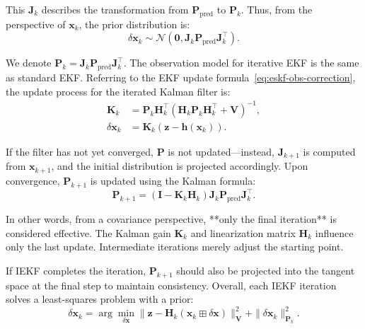 This \(\mathbf{J}_k\) describes the transformation from \(\mathbf{P}_{\mathrm{pred}}\) to \(\mathbf{P}_k\). Thus, from the perspective of \(\mathbf{x}_{k}\), the prior distribution is:  
\begin{equation}\label{key}  
	\delta \mathbf{x}_k \sim \mathcal{N}(\mathbf{0}, \mathbf{J}_k \mathbf{P}_{\mathrm{pred}} \mathbf{J}_k^\top).  
\end{equation}  

We denote \(\mathbf{P}_k = \mathbf{J}_k \mathbf{P}_{\mathrm{pred}} \mathbf{J}_k^\top\). The observation model for iterative EKF is the same as standard EKF. Referring to the EKF update formula~\eqref{eq:eskf-obs-correction}, the update process for the iterated Kalman filter is:  
\begin{subequations}\label{eq:ieskf-obs-correction}  
	\begin{align}  
		\mathbf{K}_k &= \mathbf{P}_{k} \mathbf{H}_k^\top(\mathbf{H}_k \mathbf{P}_{k}   
		\mathbf{H}_k^\top + \mathbf{V})^{-1} ,\\  
		\delta \mathbf{x}_k &= \mathbf{K}_k (\mathbf{z} - \mathbf{h}(\mathbf{x}_k)).  
	\end{align}  
\end{subequations}  

If the filter has not yet converged, \(\mathbf{P}\) is not updated—instead, \(\mathbf{J}_{k+1}\) is computed from \(\mathbf{x}_{k+1}\), and the initial distribution is projected accordingly. Upon convergence, \(\mathbf{P}_{k+1}\) is updated using the Kalman formula:  
\begin{equation}\label{eq:update-of-iekf}  
	\mathbf{P}_{k+1} = (\mathbf{I} - \mathbf{K}_k \mathbf{H}_k)\mathbf{J}_k \mathbf{P}_{\mathrm{pred}} \mathbf{J}_k^\top.  
\end{equation}  

In other words, from a covariance perspective, **only the final iteration** is considered effective. The Kalman gain \(\mathbf{K}_k\) and linearization matrix \(\mathbf{H}_k\) influence only the last update. Intermediate iterations merely adjust the starting point.  

If IEKF completes the iteration, \(\mathbf{P}_{k+1}\) should also be projected into the tangent space at the final step to maintain consistency. Overall, each IEKF iteration solves a least-squares problem with a prior:  
\begin{equation}\label{key}  
	\delta \mathbf{x}_k = \arg \min\limits_{\delta \mathbf{x}} \| \mathbf{z} - \mathbf{H}_k(\mathbf{x}_k \boxplus \delta \mathbf{x}) \|_{\mathbf{V}}^2 + \| \delta \mathbf{x}_k \|_{\mathbf{P}_k}^2.  
\end{equation}  

